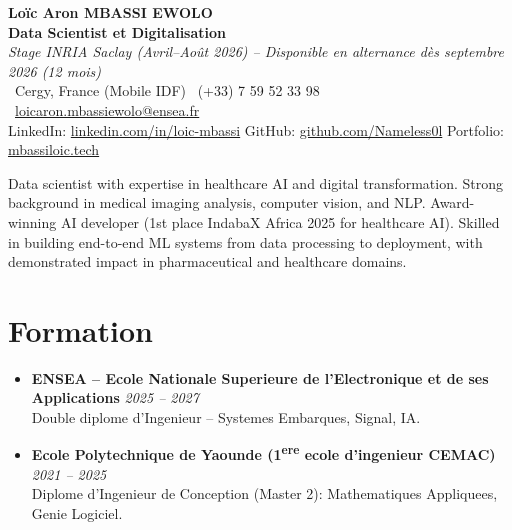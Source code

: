 \documentclass[a4paper,11pt]{article}
\begin{document}
\begin{center}
    {\Large \textbf{Lo\"ic Aron MBASSI EWOLO}} \\ \vspace{4pt}
    \textbf{\large Data Scientist et Digitalisation} \\
    \textit{\small Stage INRIA Saclay (Avril--Ao\^ut 2026) -- Disponible en alternance d\`es septembre 2026 (12 mois)} \\ \vspace{4pt}
    \small
    \Pointinghand\ Cergy, France (Mobile IDF) \quad
    \Mobilefone\ (+33) 7 59 52 33 98 \quad
    {\color{primary}\Letter\ \href{mailto:loicaron.mbassiewolo@ensea.fr}{loicaron.mbassiewolo@ensea.fr}} \\ \vspace{2pt}
    {\color{primary}LinkedIn: \href{https://www.linkedin.com/in/loic-mbassi/}{linkedin.com/in/loic-mbassi}} \quad
    {\color{primary}GitHub: \href{https://github.com/Nameless0l}{github.com/Nameless0l}} \quad
    {\color{primary}Portfolio: \href{https://mbassiloic.tech}{mbassiloic.tech}}
\end{center}
\vspace{-6pt}

\noindent\small{Data scientist with expertise in healthcare AI and digital transformation. Strong background in medical imaging analysis, computer vision, and NLP. Award-winning AI developer (1st place IndabaX Africa 2025 for healthcare AI). Skilled in building end-to-end ML systems from data processing to deployment, with demonstrated impact in pharmaceutical and healthcare domains.}

\section{Formation}
\begin{itemize}[leftmargin=*, label=\tiny$\bullet$, nosep]
    \item \textbf{ENSEA -- Ecole Nationale Superieure de l'Electronique et de ses Applications} \hfill \textit{2025 -- 2027} \\
    \small{Double diplome d'Ingenieur -- Systemes Embarques, Signal, IA.}
    \item \textbf{Ecole Polytechnique de Yaounde (1\textsuperscript{ere} ecole d'ingenieur CEMAC)} \hfill \textit{2021 -- 2025} \\
    \small{Diplome d'Ingenieur de Conception (Master 2): Mathematiques Appliquees, Genie Logiciel.}
\end{itemize}
\end{document}
